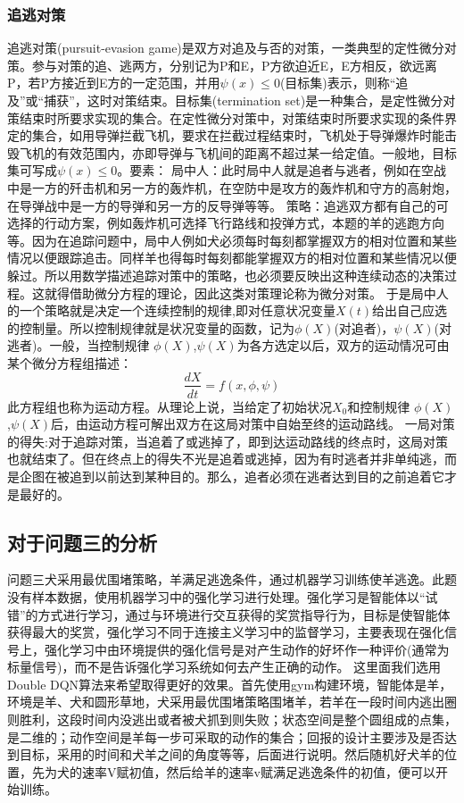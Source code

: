 \subsubsection{追逃对策}
追逃对策(pursuit-evasion game)是双方对追及与否的对策，一类典型的定性微分对策。参与对策的追、逃两方，分别记为P和E，P方欲迫近E，E方相反，欲远离P，若P方接近到E方的一定范围，并用$\psi (x)\le 0$(目标集)表示，则称“追及”或“捕获”，这时对策结束。目标集(termination set)是一种集合，是定性微分对策结束时所要求实现的集合。在定性微分对策中，对策结束时所要求实现的条件界定的集合，如用导弹拦截飞机，要求在拦截过程结束时，飞机处于导弹爆炸时能击毁飞机的有效范围内，亦即导弹与飞机间的距离不超过某一给定值。一般地，目标集可写成$\psi (x)\le 0$。要素：
\newline\indent
局中人：此时局中人就是追者与逃者，例如在空战中是一方的歼击机和另一方的轰炸机，在空防中是攻方的轰炸机和守方的高射炮，在导弹战中是一方的导弹和另一方的反导弹等等。
\newline\indent
策略：追逃双方都有自己的可选择的行动方案，例如轰炸机可选择飞行路线和投弹方式，本题的羊的逃跑方向等。因为在追踪问题中，局中人例如犬必须每时每刻都掌握双方的相对位置和某些情况以便跟踪追击。同样羊也得每时每刻都能掌握双方的相对位置和某些情况以便躲过。所以用数学描述追踪对策中的策略，也必须要反映出这种连续动态的决策过程。这就得借助微分方程的理论，因此这类对策理论称为微分对策。
\newline\indent
于是局中人的一个策略就是决定一个连续控制的规律,即对任意状况变量$X(t)$给出自己应选的控制量。所以控制规律就是状况变量的函数，记为$\phi (X)$(对追者)，$\psi (X)$(对逃者)。一般，当控制规律 $\phi (X)$,$\psi (X)$为各方选定以后，双方的运动情况可由某个微分方程组描述：
\begin{equation}
    \frac{dX}{dt}=f(x,\phi ,\psi )
\end{equation}
此方程组也称为运动方程。从理论上说，当给定了初始状况${{X}_{0}}$和控制规律
$\phi (X)$,$\psi (X)$后，由运动方程可解出双方在这局对策中自始至终的运动路线。
\zhcrlf 一局对策的得失:对于追踪对策，当追着了或逃掉了，即到达运动路线的终点时，这局对策也就结束了。但在终点上的得失不光是追着或逃掉，因为有时逃者并非单纯逃，而是企图在被追到以前达到某种目的。那么，追者必须在逃者达到目的之前追着它才是最好的。
\subsection{对于问题三的分析}
问题三犬采用最优围堵策略，羊满足逃逸条件，通过机器学习训练使羊逃逸。此题没有样本数据，使用机器学习中的强化学习进行处理。强化学习是智能体以“试错”的方式进行学习，通过与环境进行交互获得的奖赏指导行为，目标是使智能体获得最大的奖赏，强化学习不同于连接主义学习中的监督学习，主要表现在强化信号上，强化学习中由环境提供的强化信号是对产生动作的好坏作一种评价(通常为标量信号)，而不是告诉强化学习系统如何去产生正确的动作。	
\zhcrlf
这里面我们选用Double DQN算法来希望取得更好的效果。首先使用\newline gym构建环境，智能体是羊，环境是羊、犬和圆形草地，犬采用最优围堵策略围堵羊，若羊在一段时间内逃出圈则胜利，这段时间内没逃出或者被犬抓到则失败；状态空间是整个圆组成的点集，是二维的；动作空间是羊每一步可采取的动作的集合；回报的设计主要涉及是否达到目标，采用的时间和犬羊之间的角度等等，后面进行说明。然后随机好犬羊的位置，先为犬的速率V赋初值，然后给羊的速率v赋满足逃逸条件的初值，便可以开始训练。
